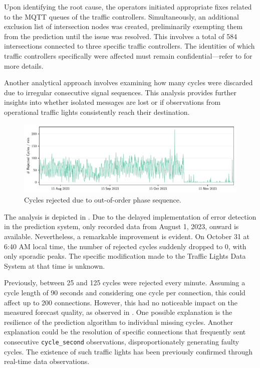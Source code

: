 Upon identifying the root cause, the operators initiated appropriate fixes related to the MQTT queues of the traffic controllers. Simultaneously, an additional exclusion list of intersection nodes was created, preliminarily exempting them from the prediction until the issue was resolved. This involves a total of 584 intersections connected to three specific traffic controllers. The identities of which traffic controllers specifically were affected must remain confidential—refer to \cite{neuner_leitfaden_2020} for more details.

Another analytical approach involves examining how many cycles were discarded due to irregular consecutive signal sequences. This analysis provides further insights into whether isolated messages are lost or if observations from operational traffic lights consistently reach their destination.

\begin{figure}
    \centering
    \includegraphics[width=\linewidth]{images/monitoring-rejected-cycles.pdf}
    \caption{Cycles rejected due to out-of-order phase sequence.}\label{fig:monitoring-rejected-cycles}
\end{figure}

The analysis is depicted in . Due to the delayed implementation of error detection in the prediction system, only recorded data from August 1, 2023, onward is available. Nevertheless, a remarkable improvement is evident. On October 31 at 6:40 AM local time, the number of rejected cycles suddenly dropped to 0, with only sporadic peaks. The specific modification made to the Traffic Lights Data System at that time is unknown.

Previously, between 25 and 125 cycles were rejected every minute. Assuming a cycle length of 90 seconds and considering one cycle per connection, this could affect up to 200 connections. However, this had no noticeable impact on the measured forecast quality, as observed in . One possible explanation is the resilience of the prediction algorithm to individual missing cycles. Another explanation could be the resolution of specific connections that frequently sent consecutive \texttt{cycle\_second} observations, disproportionately generating faulty cycles. The existence of such traffic lights has been previously confirmed through real-time data observations.

